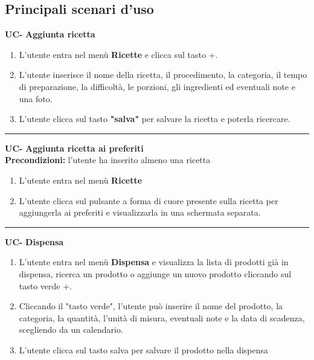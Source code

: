 \documentclass[a4paper, 12pt]{article}
\begin{document}
\setcounter{cp}{1}  
\renewcommand{\count}{ \arabic{cp} \stepcounter{cp} }  

\newpage
\subsection{Principali scenari d’uso}
{\large\textbf{UC-\count} \hspace{0.5 cm}   \textbf{Aggiunta ricetta}}
\begin{enumerate}[label=\arabic*.]
    \item L’utente entra nel menù \textbf{Ricette} e clicca sul tasto +.
    \item L’utente inserisce il nome della ricetta, il procedimento, la categoria, il tempo di preparazione, la difficoltà, le porzioni, gli ingredienti ed eventuali note e una foto.
    \item L’utente clicca sul tasto \textbf{"salva"} per salvare la ricetta e poterla ricercare. 
\end{enumerate}

\vspace{0.5 cm}
\hrule
\vspace{0.5 cm}

\raggedright{\large\textbf{UC-\count} \hspace{0.5 cm} \textbf{Aggiunta ricetta ai preferiti}}\\[0.5 cm]
\textbf{Precondizioni:} l’utente ha inserito almeno una ricetta
\begin{enumerate}[label=\arabic*.]
    \item L’utente entra nel menù \textbf{Ricette}
    \item L’utente clicca sul pulsante a forma di cuore presente sulla ricetta per aggiungerla ai preferiti e visualizzarla in una schermata separata.
\end{enumerate}

\vspace{0.5 cm}
\hrule
\vspace{0.5 cm}

{\large\textbf{UC-\count} \hspace{0.5 cm}   \textbf{Dispensa}}
\begin{enumerate}[label=\arabic*.]
    \item L’utente entra nel menù \textbf{Dispensa} e visualizza la lista di prodotti già in dispensa, ricerca un prodotto o aggiunge un nuovo prodotto cliccando sul tasto verde +.
    \item Cliccando il "tasto verde", l’utente può inserire il nome del prodotto, la categoria, la quantità, l’unità di misura, eventuali note e la data di scadenza, scegliendo da un calendario.
    \item L’utente clicca sul tasto salva per salvare il prodotto nella dispensa
\end{enumerate}
\end{document}
